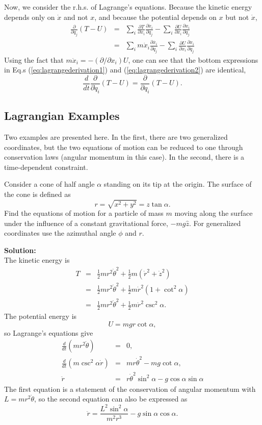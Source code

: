 Now, we consider the r.h.s. of Lagrange's equations. Because the
kinetic energy depends only on $\dot{x}$ and not $x$, and because the
potential depends on $x$ but not $\dot{x}$,
\begin{eqnarray}
\label{eq:lagrangederivation2}
\frac{\partial}{\partial q_j}(T-U)&=&\sum_i\frac{\partial
  T}{\partial\dot{x}_i}\frac{\partial\dot{x_i}}{\partial q_j}
-\sum_i\frac{\partial U}{\partial x_i}\frac{\partial x_i}{\partial
  q_j}\\ \nonumber &=&\sum_i
m\dot{x}_i\frac{\partial\dot{x_i}}{\partial q_j} -\sum_i\frac{\partial
  U}{\partial x_i}\frac{\partial x_i}{\partial q_j}
\end{eqnarray}
Using the fact that $m\ddot{x}_i=-(\partial/\partial x_i)U$, one can
see that the bottom expressions in Eq.s (\ref{eq:lagrangederivation1})
and (\ref{eq:lagrangederivation2}) are identical,
\begin{equation}
\frac{d}{dt}\frac{\partial}{\partial\dot{q}_i}(T-U)=\frac{\partial}{\partial
  q_i}(T-U).
\end{equation}

\subsection{Lagrangian Examples}

Two examples are presented here. In the first, there are two
generalized coordinates, but the two equations of motion can be
reduced to one through conservation laws (angular momentum in this
case). In the second, there is a time-dependent constraint.

\example Consider a cone of half angle $\alpha$ standing on its tip at
the origin. The surface of the cone is defined as
\[
r=\sqrt{x^2+y^2}=z\tan \alpha.
\]
Find the equations of motion for a particle of mass $m$ moving along
the surface under the influence of a constant gravitational force,
$-mg\hat{z}$. For generalized coordinates use the azimuthal angle
$\phi$ and $r$.

{\bf Solution:}\\ The kinetic energy is
\begin{eqnarray*}
T&=&\frac{1}{2}mr^2\dot{\theta}^2+\frac{1}{2}m(\dot{r}^2+\dot{z}^2)\\ &=&\frac{1}{2}mr^2\dot{\theta}^2+\frac{1}{2}m\dot{r}^2\left(1+\cot^2\alpha\right)\\ &=&\frac{1}{2}mr^2\dot{\theta}^2+\frac{1}{2}m\dot{r}^2\csc^2\alpha.
\end{eqnarray*}
The potential energy is
\[
U=mgr\cot\alpha,
\]
so Lagrange's equations give
\begin{eqnarray*}
\frac{d}{dt}\left(mr^2\dot{\theta}\right)&=&0,\\ \frac{d}{dt}\left(m\csc^2\alpha
\dot{r}\right)&=&mr\dot{\theta}^2-mg\cot\alpha,\\ \ddot{r}&=&r\dot{\theta}^2\sin^2\alpha-g\cos\alpha\sin\alpha
\end{eqnarray*}
The first equation is a statement of the conservation of angular
momentum with $L=mr^2\dot{\theta}$, so the second equation can also be
expressed as
\[
\ddot{r}=\frac{L^2\sin^2\alpha}{m^2r^3}-g\sin\alpha\cos\alpha.
\]


